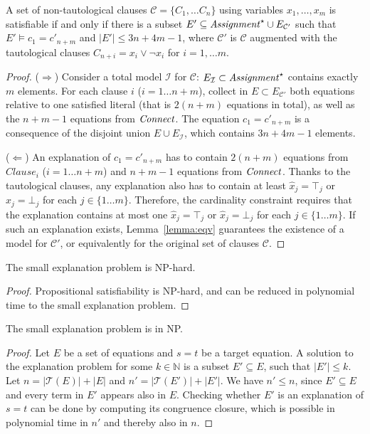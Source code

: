 \documentclass[smallextended]{svjour3}
\begin{document}
\begin{lemma}
A set of non-tautological clauses $\mathcal{C}= \{C_1, \dots C_n\}$ using
variables $x_1,\dots, x_m$ is satisfiable if and only if there is a subset $E'
\subseteq {\it Assignment}^\star \cup E_{\mathcal{C}'}$ such that $E'\models
c_1 = c'_{n+m}$ and $|E'| \leq 3n+4m-1$, where $\mathcal{C}'$ is
$\mathcal{C}$ augmented with the tautological clauses $C_{n+i} = x_i \vee \neg
x_i$ for $i=1,\dots m$.
\end{lemma}
\begin{proof}
($\Rightarrow$)  Consider a total model $\mathcal{I}$ for
$\mathcal{C}$: $E_{\mathcal{I}} \subset {\it Assignment}^\star$ contains exactly $m$
elements.  For each clause $i$ ($i= 1\dots n + m$), collect in $E\subset
E_{\mathcal{C}'}$ both equations relative to one satisfied literal (that is $2(n
+m)$ equations in total), as well as the $n + m - 1$ equations from ${\it Connect}$.
The equation $c_1 = c'_{n+m}$ is a consequence of the disjoint union
$E \cup E_{\mathcal{I}}$, which contains $3n + 4m - 1$ elements.

($\Leftarrow$)  An explanation of $c_1 = c'_{n+m}$ has to contain $2(n + m)$ equations from $Clause_i$ 
($i= 1\dots n + m$) and $n + m - 1$ equations from ${\it Connect}$.  Thanks to the tautological
clauses, any explanation also has to contain at least $\hat{x}_j = \top_j$ or
$\hat{x}_j = \bot_j$ for each $j\in\{1\dots m\}$.  Therefore, the cardinality
constraint requires that the explanation contains at most one $\hat{x}_j =
\top_j$ or $\hat{x}_j = \bot_j$ for each $j\in\{1\dots m\}$.  If such an
explanation exists, Lemma~\ref{lemma:eqv} guarantees the existence of a model
for $\mathcal{C'}$, or equivalently for the original set of clauses
$\mathcal{C}$.
\end{proof}

\begin{corollary}[NP-hardness]
\label{lemma:nphardness}
The small explanation problem is NP-hard.
\end{corollary}
\begin{proof}
Propositional satisfiability is NP-hard, and can be reduced in polynomial time to the small explanation problem.
\end{proof}

\begin{lemma}[NP]
\label{lemma:innp}
The small explanation problem is in NP.
\end{lemma}
\begin{proof}
Let $E$ be a set of equations and $s=t$ be a target equation.
A solution to the explanation problem for some $k \in \mathbb{N}$ is a subset $E' \subseteq E$, such that $|E'| \leq k$.
Let $n = |\mathcal{T}(E)| + |E|$ and $n' = |\mathcal{T}(E')| + |E'|$.
We have $n' \leq n$, since $E' \subseteq E$ and every term in $E'$ appears also in $E$.
Checking whether $E'$ is an explanation of $s=t$ can be done by computing its congruence closure, which is possible in polynomial time in $n'$ \cite{Nelson2} and thereby also in $n$.

\end{proof}
\end{document}
